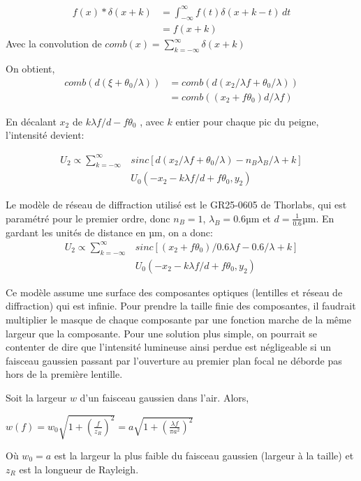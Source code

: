 \documentclass[11pt,letterpaper]{article}
\begin{document}
\begin{align*}
    f(x)*\delta(x+k) &= \int_{-\infty}^{\infty} f(t) \delta(x+k-t) \, dt \\   
    &= f(x+k)
\end{align*}
Avec la convolution de $comb(x)=\sum_{k=-\infty}^{\infty}\delta(x+k)$

On obtient,   
\begin{align*}
    comb(d(\xi+\theta_0/\lambda))&=comb(d(x_2/\lambda f+\theta_0/\lambda))
    \\&=comb((x_2+f\theta_0)d/\lambda f)
\end{align*}

En décalant $x_2$ de $k\lambda f / d - f\theta_0$ , avec $k$ entier pour chaque pic du peigne, l'intensité devient:


\begin{align*}
    U_2 \propto \sum_{k=-\infty}^{\infty}&sinc[d(x_2/\lambda f+\theta_0/\lambda)-n_B\lambda_B/\lambda + k] \\
    &U_0(-x_2-k\lambda f / d + f\theta_0, y_2)
\end{align*}


Le modèle de réseau de diffraction utilisé est le GR25-0605 de Thorlabs, qui est paramétré pour le premier ordre, donc $n_B=1$, $\lambda_B=0.6$µm et $d=\frac{1}{0.6}$µm. \cite{thorlab-gratting} En gardant les unités de distance en µm, on a donc:
\begin{align*}
    U_2 \propto \sum_{k=-\infty}^{\infty}&sinc[(x_2+f\theta_0)/0.6 \lambda f-0.6/\lambda + k]\\
    &U_0(-x_2-k\lambda f / d + f\theta_0, y_2)
\end{align*}


Ce modèle assume une surface des composantes optiques (lentilles et réseau de diffraction) qui est infinie. Pour prendre la taille finie des composantes, il faudrait multiplier le masque de chaque composante par une fonction marche de la même largeur que la composante. Pour une solution plus simple, on pourrait se contenter de dire que l'intensité lumineuse ainsi perdue est négligeable si un faisceau gaussien passant par l'ouverture au premier plan focal ne déborde pas hors de la première lentille.

Soit la largeur $w$ d'un faisceau gaussien dans l'air. Alors,

$w(f)=w_0 \sqrt{1+(\frac{f}{z_R})^2}= a\sqrt{1+(\frac{\lambda f}{\pi a^2})^2} $

Où $w_0=a$ est la largeur la plus faible du faisceau gaussien (largeur à la taille) et $z_R$ est la longueur de Rayleigh.
\end{document}
